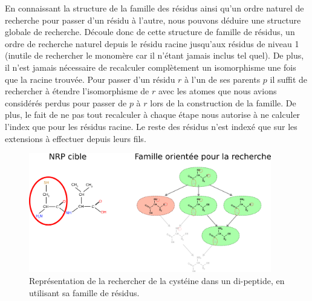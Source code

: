 En connaissant la structure de la famille des résidus ainsi qu'un ordre naturel de recherche pour passer d'un résidu à l'autre, nous pouvons déduire une structure globale de recherche.
Découle donc de cette structure de famille de résidus, un ordre de recherche naturel depuis le résidu racine jusqu'aux résidus de niveau 1 (inutile de rechercher le monomère car il n'étant jamais inclus tel quel).
De plus, il n'est jamais nécessaire de recalculer complètement un isomorphisme une fois que la racine trouvée.
Pour passer d'un résidu $r$ à l'un de ses parents $p$ il suffit de rechercher à étendre l'isomorphisme de $r$ avec les atomes que nous avions considérés perdus pour passer de $p$ à $r$ lors de la construction de la famille.
De plus, le fait de ne pas tout recalculer à chaque étape nous autorise à ne calculer l'index que pour les résidus racine.
Le reste des résidus n'est indexé que sur les extensions à effectuer depuis leurs fils.

% 
%   
%   
%     
%   

\begin{figure}[!ht]
  \begin{center}
    \includegraphics[width=400px]{Figures/s2m/residues/cystein_family_search.png}
    \caption{\label{family_search}Représentation de la rechercher de la cystéine dans un di-peptide, en utilisant sa famille de résidus.}
  \end{center}
\end{figure}

